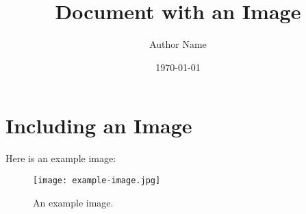 \documentclass{article}
\title{Document with an Image}
\author{Author Name}
\date{\today}
\begin{document}
\maketitle

\section{Including an Image}

Here is an example image:

\begin{figure}[h!]
    \centering
    \texttt{[image: example-image.jpg]}
    \caption{An example image.}
\end{figure}
\end{document}
